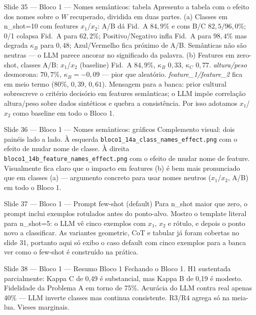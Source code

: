 \documentclass[aspectratio=169,10pt]{beamer}
\begin{document}
\begin{frame}{Slide 35 --- Bloco 1 --- Nomes sem\^anticos: tabela}
\footnotesize
Apresento a tabela com o efeito dos nomes sobre o $W$ recuperado, dividida em duas partes. (a) Classes em n\_shot=10 com features $x_1$/$x_2$: A/B d\'a Fid.\ A $84{,}9\%$ e cons B/C $82{,}5/96{,}0\%$; 0/1 colapsa Fid.\ A para $62{,}2\%$; Positivo/Negativo infla Fid.\ A para $98{,}4\%$ mas degrada $\kappa_B$ para $0{,}48$; Azul/Vermelho fica pr\'oximo de A/B. Sem\^anticas n\~ao s\~ao neutras --- o LLM parece ancorar no significado da palavra. (b) Features em zero-shot, classes A/B: $x_1$/$x_2$ (baseline) Fid.\ A $84{,}9\%$, $\kappa_B$ $0{,}33$, $\kappa_C$ $0{,}77$. \emph{altura/peso} desmorona: $70{,}7\%$, $\kappa_B = -0{,}09$ --- pior que aleat\'orio. \emph{feature\_1/feature\_2} fica em meio termo ($80\%$, $0{,}39$, $0{,}61$). Mensagem para a banca: prior cultural sobrescreve o crit\'erio decis\'orio em features sem\^anticas; o LLM imp\~oe correla\c{c}\~ao altura/peso sobre dados sint\'eticos e quebra a consist\^encia. Por isso adotamos $x_1$/$x_2$ como baseline em todo o Bloco 1.
\end{frame}

\begin{frame}{Slide 36 --- Bloco 1 --- Nomes sem\^anticos: gr\'aficos}
\footnotesize
Complemento visual: dois pain\'eis lado a lado. \`A esquerda \texttt{bloco1\_14a\_class\_names\_effect.png} com o efeito de mudar nome de classe. \`A direita \texttt{bloco1\_14b\_feature\_names\_effect.png} com o efeito de mudar nome de feature. Visualmente fica claro que o impacto em features (b) \'e bem mais pronunciado que em classes (a) --- argumento concreto para usar nomes neutros ($x_1$/$x_2$, A/B) em todo o Bloco 1.
\end{frame}

\begin{frame}{Slide 37 --- Bloco 1 --- Prompt few-shot (default)}
\footnotesize
Para n\_shot maior que zero, o prompt inclui exemplos rotulados antes do ponto-alvo. Mostro o template literal para n\_shot=5: o LLM v\^e cinco exemplos com $x_1$, $x_2$ e r\'otulo, e depois o ponto novo a classificar. As variantes geometric, CoT e tabular j\'a foram cobertas no slide 31, portanto aqui s\'o exibo o caso default com cinco exemplos para a banca ver como o few-shot \'e constru\'ido na pr\'atica.
\end{frame}

\begin{frame}{Slide 38 --- Bloco 1 --- Resumo Bloco 1}
\footnotesize
Fechando o Bloco 1. H1 sustentada parcialmente: Kappa C de 0{,}49 \'e substancial, mas Kappa B de 0{,}19 \'e modesto. Fidelidade da Problema A em torno de 75\%. Acur\'acia do LLM contra real apenas 40\% --- LLM inverte classes mas continua consistente. R3/R4 agrega s\'o na meia-lua. Vieses marginais.
\end{frame}
\end{document}
